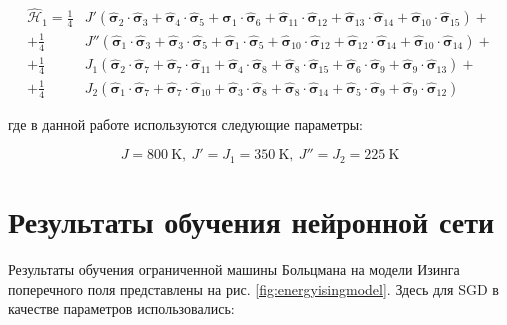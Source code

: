 \begin{equation*}
\begin{split}
\hat{\mathcal{H}}_1=\frac{1}{4}&J'(\hat{\boldsymbol{\sigma}}_2 \cdot \hat{\boldsymbol{\sigma}}_3 + \hat{\boldsymbol{\sigma}}_4 \cdot \hat{\boldsymbol{\sigma}}_5 + \hat{\boldsymbol{\sigma}}_1 \cdot \hat{\boldsymbol{\sigma}}_6 + \hat{\boldsymbol{\sigma}}_{11} \cdot \hat{\boldsymbol{\sigma}}_{12} + \hat{\boldsymbol{\sigma}}_{13} \cdot \hat{\boldsymbol{\sigma}}_{14} + \hat{\boldsymbol{\sigma}}_{10} \cdot \hat{\boldsymbol{\sigma}}_{15})+\\
+\frac{1}{4}&J''(\hat{\boldsymbol{\sigma}}_1 \cdot \hat{\boldsymbol{\sigma}}_3 + \hat{\boldsymbol{\sigma}}_3 \cdot \hat{\boldsymbol{\sigma}}_5 + \hat{\boldsymbol{\sigma}}_1 \cdot \hat{\boldsymbol{\sigma}}_5 + \hat{\boldsymbol{\sigma}}_{10} \cdot \hat{\boldsymbol{\sigma}}_{12} + \hat{\boldsymbol{\sigma}}_{12} \cdot \hat{\boldsymbol{\sigma}}_{14} + \hat{\boldsymbol{\sigma}}_{10} \cdot \hat{\boldsymbol{\sigma}}_{14}) + \\
+\frac{1}{4}&J_1 (\hat{\boldsymbol{\sigma}}_2 \cdot \hat{\boldsymbol{\sigma}}_7 + \hat{\boldsymbol{\sigma}}_7 \cdot \hat{\boldsymbol{\sigma}}_{11} + \hat{\boldsymbol{\sigma}}_4 \cdot \hat{\boldsymbol{\sigma}}_8 + \hat{\boldsymbol{\sigma}}_{8} \cdot \hat{\boldsymbol{\sigma}}_{15} + \hat{\boldsymbol{\sigma}}_{6} \cdot \hat{\boldsymbol{\sigma}}_{9} + \hat{\boldsymbol{\sigma}}_{9} \cdot \hat{\boldsymbol{\sigma}}_{13}) + \\
+\frac{1}{4}&J_2 (\hat{\boldsymbol{\sigma}}_1 \cdot \hat{\boldsymbol{\sigma}}_7 + \hat{\boldsymbol{\sigma}}_7 \cdot \hat{\boldsymbol{\sigma}}_{10} + \hat{\boldsymbol{\sigma}}_3 \cdot \hat{\boldsymbol{\sigma}}_8 + \hat{\boldsymbol{\sigma}}_{8} \cdot \hat{\boldsymbol{\sigma}}_{14} + \hat{\boldsymbol{\sigma}}_{5} \cdot \hat{\boldsymbol{\sigma}}_{9} + \hat{\boldsymbol{\sigma}}_{9} \cdot \hat{\boldsymbol{\sigma}}_{12})
\end{split}
\end{equation*}

\noindent где в данной работе используются следующие параметры:

\[
J=800\ \text{K},\ J'=J_1=350\ \text{K},\ J''=J_2=225\ \text{K}
\]

\section{Результаты обучения нейронной сети}

Результаты обучения ограниченной машины Больцмана на модели Изинга поперечного поля представлены на рис. \ref{fig:energyisingmodel}. Здесь для SGD в качестве параметров использовались:

